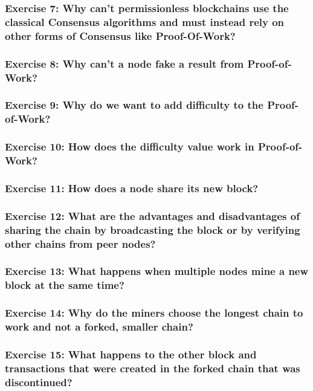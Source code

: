 \documentclass[12pt,a4paper]{article}
\theoremstyle{definition}
\begin{document}

\subsubsection*{Exercise 7: Why can't permissionless blockchains use the classical Consensus algorithms and must instead rely on other forms of Consensus like Proof-Of-Work?}

\subsubsection*{Exercise 8: Why can't a node fake a result from Proof-of-Work?}

\subsubsection*{Exercise 9: Why do we want to add difficulty to the Proof-of-Work?}

\subsubsection*{Exercise 10: How does the difficulty value work in Proof-of-Work?}


\subsubsection*{Exercise 11: How does a node share its new block?}

\subsubsection*{Exercise 12: What are the advantages and disadvantages of sharing the chain by broadcasting the block or by verifying other chains from peer nodes?}

\subsubsection*{Exercise 13: What happens when multiple nodes mine a new block at the same time?}

\subsubsection*{Exercise 14: Why do the miners choose the longest chain to work and not a forked, smaller chain?}

\subsubsection*{Exercise 15: What happens to the other block and transactions that were created in the forked chain that was discontinued?}
\end{document}
